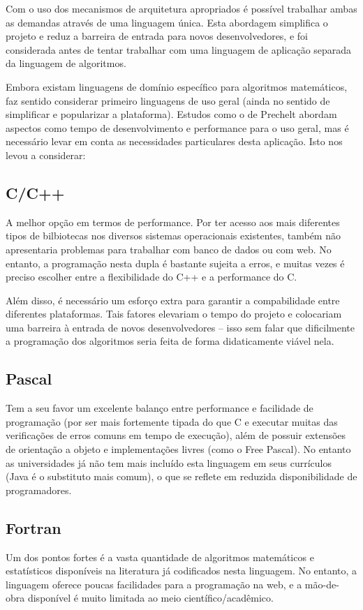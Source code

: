 \documentclass{abnt}
\begin{document}
Com o uso dos mecanismos de arquitetura apropriados é possível trabalhar ambas as demandas através de uma linguagem única. Esta abordagem simplifica o projeto e reduz a barreira de entrada para novos desenvolvedores, e foi considerada antes de tentar trabalhar com uma linguagem de aplicação separada da linguagem de algoritmos.

Embora existam linguagens de domínio específico para algoritmos matemáticos, faz sentido considerar primeiro linguagens de uso geral (ainda no sentido de simplificar e popularizar a plataforma). Estudos como o de Prechelt\cite{Prechelt} abordam aspectos como tempo de desenvolvimento e performance para o uso geral, mas é necessário levar em conta as necessidades particulares desta aplicação. Isto nos levou a considerar:

\subsection{C/C++}
A melhor opção em termos de performance. Por ter acesso aos mais diferentes tipos de bilbiotecas nos diversos sistemas operacionais existentes, também não apresentaria problemas para trabalhar com banco de dados ou com web. No entanto, a programação nesta dupla é bastante sujeita a erros, e muitas vezes é preciso escolher entre a flexibilidade do C++ e a performance do C.

Além disso, é necessário um esforço extra para garantir a compabilidade entre diferentes plataformas. Tais fatores elevariam o tempo do  projeto e colocariam uma barreira à entrada de novos desenvolvedores – isso sem falar que dificilmente a programação dos algoritmos seria feita de forma didaticamente viável nela.

\subsection{Pascal}
Tem a seu favor um excelente balanço entre performance e facilidade de programação (por ser mais fortemente tipada do que C e executar muitas das verificações de erros comuns em tempo de execução), além de possuir extensões de orientação a objeto e implementações livres (como o Free Pascal). No entanto as universidades já não tem mais incluído esta linguagem em seus currículos (Java é o substituto mais comum), o que se reflete em reduzida disponibilidade de programadores.

\subsection{Fortran}
Um dos pontos fortes é a vasta quantidade de algoritmos matemáticos e estatísticos disponíveis na literatura já codificados nesta linguagem. No entanto, a linguagem oferece poucas facilidades para a programação na web, e a mão-de-obra disponível é muito limitada ao meio científico/acadêmico.
\end{document}

